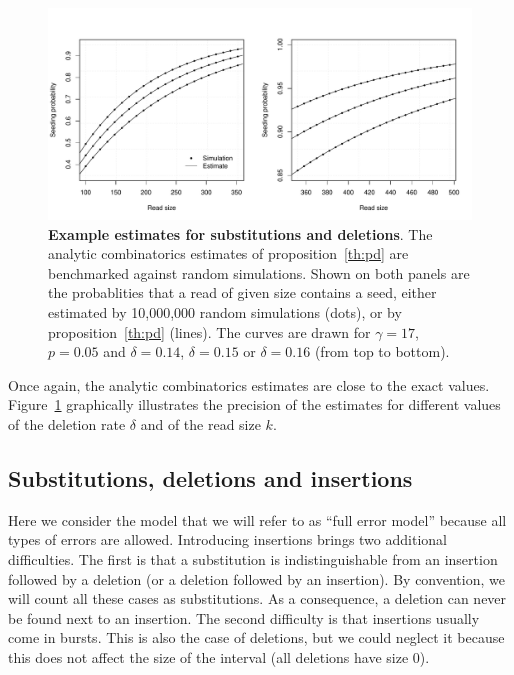 \documentclass{article}
\begin{document}
\begin{figure}[h]
\centering
\includegraphics[scale=0.445]{simulpdel.pdf}
\caption{\textbf{Example estimates for substitutions and deletions}. The
analytic combinatorics estimates of proposition~\ref{th:pd} are
benchmarked against random simulations. Shown on both panels are the
probablities that a read of given size contains a seed, either estimated
by 10,000,000 random simulations (dots), or by proposition~\ref{th:pd}
(lines). The curves are drawn for $\gamma=17$, $p=0.05$ and $\delta=0.14$,
$\delta=0.15$ or $\delta=0.16$ (from top to bottom).}
\label{fig:simulpdel}
\end{figure}

Once again, the analytic combinatorics estimates are close to the exact
values. Figure~\ref{fig:simulpdel} graphically illustrates the precision
of the estimates for different values of the deletion rate $\delta$ and
of the read size $k$.




\subsection{Substitutions, deletions and insertions}
\label{sec:insertions}

Here we consider the model that we will refer to as ``full error model''
because all types of errors are allowed. Introducing insertions brings two
additional difficulties. The first is that a substitution is
indistinguishable from an insertion followed by a deletion (or a deletion
followed by an insertion). By convention, we will count all these cases as
substitutions. As a consequence, a deletion can never be found next to an
insertion. The second difficulty is that insertions usually come in
bursts. This is also the case of deletions, but we could neglect it
because this does not affect the size of the interval (all deletions have
size $0$). 
\end{document}
